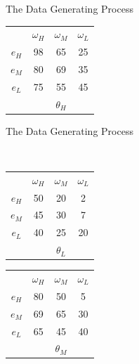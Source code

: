 \documentclass[aspectratio=169]{beamer}
\begin{document}
\begin{frame}{The Data Generating Process}
\begin{tabular}{ c|c|c|c|}
  \multicolumn{1}{c}{} & \multicolumn{1}{c}{$\omega_H$} & \multicolumn{1}{c}{$\omega_M$} & \multicolumn{1}{c}{$\omega_L$}\\
  \cline{2-4}
  $e_H$ & \cellcolor{blue!25}98 & 65 & 25 \\
  \cline{2-4}
  $e_M$ & 80 & \cellcolor{blue!25}69 & 35 \\
  \cline{2-4}
  $e_L$ & 75 & 55 & \cellcolor{blue!25}45 \\
  \cline{2-4}
  \multicolumn{1}{c}{} & \multicolumn{1}{c}{} & \multicolumn{1}{c}{$\theta_H$} & \multicolumn{1}{c}{}\\
\end{tabular}
\end{frame}



\begin{frame}{The Data Generating Process}
\begin{center}
\end{center}
\\
\bigskip
\centering
\begin{tabular}{ c|c|c|c|}
  
  \multicolumn{1}{c}{} & \multicolumn{1}{c}{$\omega_H$} & \multicolumn{1}{c}{$\omega_M$} & \multicolumn{1}{c}{$\omega_L$}\\
  \cline{2-4}
  $e_H$ & \cellcolor{blue!25}50 & 20 & 2 \\
  \cline{2-4}
  $e_M$ & 45 & \cellcolor{blue!25}30 & 7 \\
  \cline{2-4}
  $e_L$ & 40 & 25 & \cellcolor{blue!25}20 \\
  \cline{2-4}
  \multicolumn{1}{c}{} & \multicolumn{1}{c}{} & \multicolumn{1}{c}{$\theta_L$} & \multicolumn{1}{c}{}\\
\end{tabular}
\hspace{.3cm} %
\begin{tabular}{ c|c|c|c|}
  
  \multicolumn{1}{c}{} & \multicolumn{1}{c}{$\omega_H$} & \multicolumn{1}{c}{$\omega_M$} & \multicolumn{1}{c}{$\omega_L$}\\
  \cline{2-4}
  $e_H$ & \cellcolor{blue!25}80 & 50 & 5 \\
  \cline{2-4}
  $e_M$ & 69 & \cellcolor{blue!25}65 & 30 \\
  \cline{2-4}
  $e_L$ & 65 & 45 & \cellcolor{blue!25}40 \\
  \cline{2-4}
  \multicolumn{1}{c}{} & \multicolumn{1}{c}{} & \multicolumn{1}{c}{$\theta_M$} & \multicolumn{1}{c}{}\\
\end{tabular}
\hspace{.3cm} %
\begin{tabular}{ c|c|c|c|}
  

\end{tabular}
\end{frame}
\end{document}
